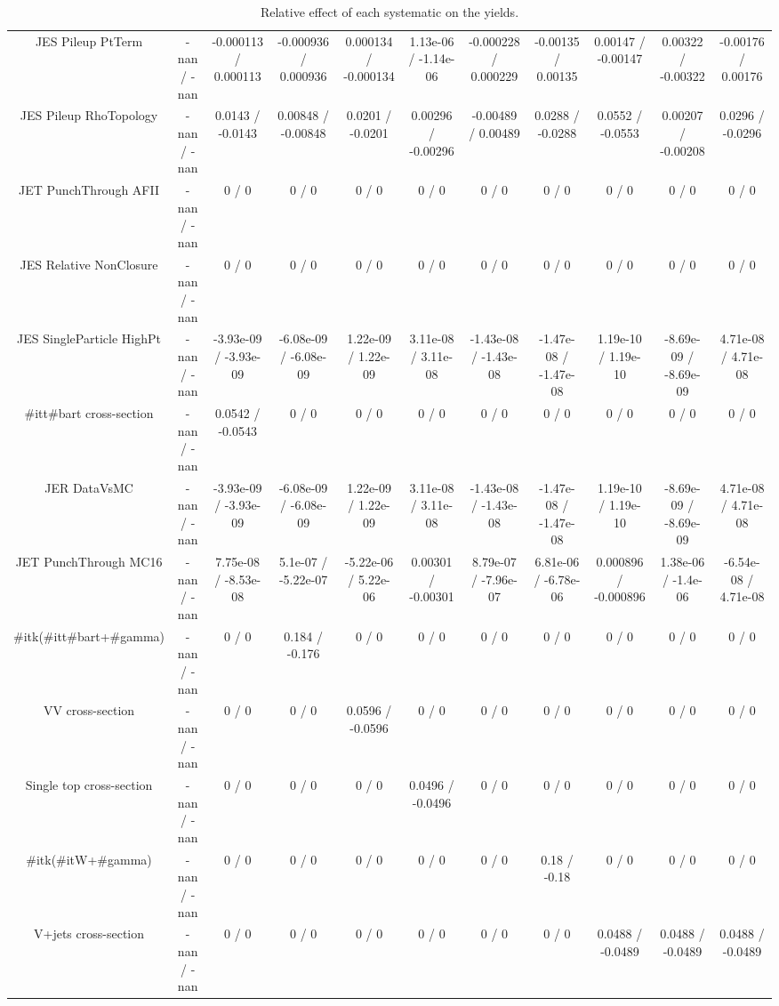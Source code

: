\begin{table}[htbp]
\begin{center}
\begin{tabular}{|c|c|c|c|c|c|c|c|c|c|c|}
  JES Pileup PtTerm & -nan / -nan & -0.000113 / 0.000113 & -0.000936 / 0.000936 & 0.000134 / -0.000134 & 1.13e-06 / -1.14e-06 & -0.000228 / 0.000229 & -0.00135 / 0.00135 & 0.00147 / -0.00147 & 0.00322 / -0.00322 & -0.00176 / 0.00176 \\ 
  JES Pileup RhoTopology & -nan / -nan & 0.0143 / -0.0143 & 0.00848 / -0.00848 & 0.0201 / -0.0201 & 0.00296 / -0.00296 & -0.00489 / 0.00489 & 0.0288 / -0.0288 & 0.0552 / -0.0553 & 0.00207 / -0.00208 & 0.0296 / -0.0296 \\ 
  JET PunchThrough AFII & -nan / -nan & 0 / 0 & 0 / 0 & 0 / 0 & 0 / 0 & 0 / 0 & 0 / 0 & 0 / 0 & 0 / 0 & 0 / 0 \\ 
  JES Relative NonClosure & -nan / -nan & 0 / 0 & 0 / 0 & 0 / 0 & 0 / 0 & 0 / 0 & 0 / 0 & 0 / 0 & 0 / 0 & 0 / 0 \\ 
  JES SingleParticle HighPt & -nan / -nan & -3.93e-09 / -3.93e-09 & -6.08e-09 / -6.08e-09 & 1.22e-09 / 1.22e-09 & 3.11e-08 / 3.11e-08 & -1.43e-08 / -1.43e-08 & -1.47e-08 / -1.47e-08 & 1.19e-10 / 1.19e-10 & -8.69e-09 / -8.69e-09 & 4.71e-08 / 4.71e-08 \\ 
  #it{t#bar{t}} cross-section & -nan / -nan & 0.0542 / -0.0543 & 0 / 0 & 0 / 0 & 0 / 0 & 0 / 0 & 0 / 0 & 0 / 0 & 0 / 0 & 0 / 0 \\ 
  JER DataVsMC & -nan / -nan & -3.93e-09 / -3.93e-09 & -6.08e-09 / -6.08e-09 & 1.22e-09 / 1.22e-09 & 3.11e-08 / 3.11e-08 & -1.43e-08 / -1.43e-08 & -1.47e-08 / -1.47e-08 & 1.19e-10 / 1.19e-10 & -8.69e-09 / -8.69e-09 & 4.71e-08 / 4.71e-08 \\ 
  JET PunchThrough MC16 & -nan / -nan & 7.75e-08 / -8.53e-08 & 5.1e-07 / -5.22e-07 & -5.22e-06 / 5.22e-06 & 0.00301 / -0.00301 & 8.79e-07 / -7.96e-07 & 6.81e-06 / -6.78e-06 & 0.000896 / -0.000896 & 1.38e-06 / -1.4e-06 & -6.54e-08 / 4.71e-08 \\ 
  #it{k}(#it{t#bar{t}+#gamma}) & -nan / -nan & 0 / 0 & 0.184 / -0.176 & 0 / 0 & 0 / 0 & 0 / 0 & 0 / 0 & 0 / 0 & 0 / 0 & 0 / 0 \\ 
  VV cross-section & -nan / -nan & 0 / 0 & 0 / 0 & 0.0596 / -0.0596 & 0 / 0 & 0 / 0 & 0 / 0 & 0 / 0 & 0 / 0 & 0 / 0 \\ 
  Single top cross-section & -nan / -nan & 0 / 0 & 0 / 0 & 0 / 0 & 0.0496 / -0.0496 & 0 / 0 & 0 / 0 & 0 / 0 & 0 / 0 & 0 / 0 \\ 
  #it{k}(#it{W+#gamma}) & -nan / -nan & 0 / 0 & 0 / 0 & 0 / 0 & 0 / 0 & 0 / 0 & 0.18 / -0.18 & 0 / 0 & 0 / 0 & 0 / 0 \\ 
  V+jets cross-section & -nan / -nan & 0 / 0 & 0 / 0 & 0 / 0 & 0 / 0 & 0 / 0 & 0 / 0 & 0.0488 / -0.0489 & 0.0488 / -0.0489 & 0.0488 / -0.0489 \\ 
\hline 
\end{tabular} 
\caption{Relative effect of each systematic on the yields.} 
\end{center} 
\end{table} 
